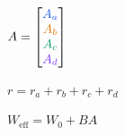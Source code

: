 \documentclass{article}
\begin{document}
\begin{preview}
{\fontsize{25}{30.0}\selectfont\color[HTML]{172033}\hbox{$\displaystyle A=\begin{bmatrix}{\color[HTML]{2563EB}A_{a}}\\{\color[HTML]{D97706}A_{b}}\\{\color[HTML]{059669}A_{c}}\\{\color[HTML]{7C3AED}A_{d}}\end{bmatrix}$}}
\end{preview}
\begin{preview}
{\fontsize{25}{30.0}\selectfont\color[HTML]{172033}\hbox{$\displaystyle r=r_a+r_b+r_c+r_d$}}
\end{preview}
\begin{preview}
{\fontsize{26}{31.2}\selectfont\color[HTML]{172033}\hbox{$\displaystyle W_{\mathrm{eff}}=W_0+BA$}}
\end{preview}
\end{document}

